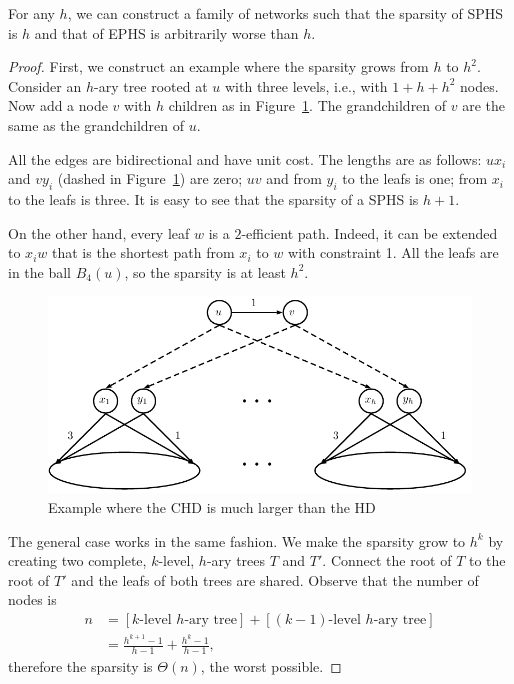 \begin{proposition}\label{prop:treelike}
For any $h$, we can construct a family of networks such that the sparsity of SPHS is $h$ and that of EPHS is arbitrarily worse than $h$.
\end{proposition}
\begin{proof}
First, we construct an example where the sparsity grows from $h$ to $h^2$.
Consider an $h$-ary tree rooted at $u$ with three levels, i.e., with $1+h+h^2$ nodes.
Now add a node $v$ with $h$ children as in Figure~\ref{fig:treelike}. 
The grandchildren of $v$ are the same as the grandchildren of $u$.

All the edges are bidirectional and have unit cost.
The lengths are as follows: $ux_i$ and $vy_i$ (dashed in Figure~\ref{fig:treelike}) are zero; $uv$ and from $y_i$ to the leafs is one; from $x_i$ to the leafs is three.
It is easy to see that the sparsity of a SPHS is $h+1$.

On the other hand, every leaf $w$ is a $2$-efficient path.
Indeed, it can be extended to $x_iw$ that is the shortest path from $x_i$ to $w$ with constraint 1.
All the leafs are in the ball $B_4(u)$, so the sparsity is at least $h^2$.

\begin{figure}
\caption{Example where the CHD is much larger than the HD}
\label{fig:treelike}
\centering
\includegraphics[scale=0.6]{TexImg/Treelike.pdf}
\end{figure}

The general case works in the same fashion.
We make the sparsity grow to $h^k$ by creating two complete, $k$-level, $h$-ary trees $T$ and $T'$.
Connect the root of $T$ to the root of $T'$ and the leafs of both trees are shared.
Observe that the number of nodes is 
\begin{align*}
n &=[\text{$k$-level $h$-ary tree}] + [\text{$(k-1)$-level $h$-ary tree}]\\
&= \frac{h^{k+1}-1}{h-1} + \frac{h^k-1}{h-1},
\end{align*}
therefore the sparsity is $\Theta(n)$, the worst possible.
\end{proof}

